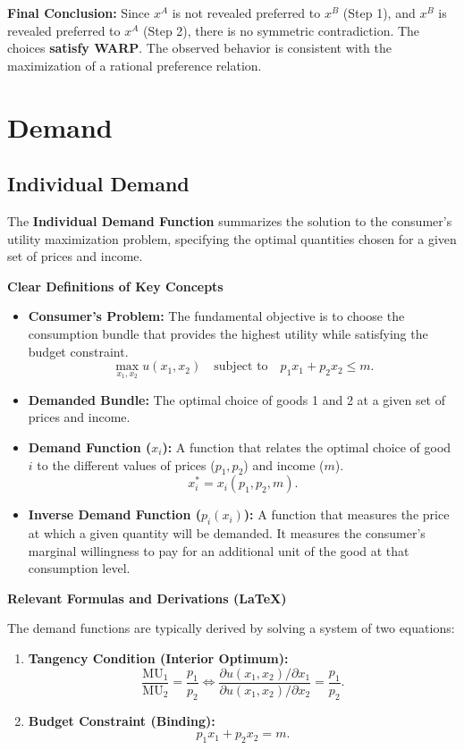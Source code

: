 \documentclass{article}
\begin{document}
\textbf{Final Conclusion:} Since $x^A$ is not revealed preferred to $x^B$ (Step 1), and $x^B$ is revealed preferred to $x^A$ (Step 2), there is no symmetric contradiction. The choices \textbf{satisfy WARP}. The observed behavior is consistent with the maximization of a rational preference relation.

\hrulefill

\section*{Demand}
\subsection*{Individual Demand}

The \textbf{Individual Demand Function} summarizes the solution to the consumer's utility maximization problem, specifying the optimal quantities chosen for a given set of prices and income.

\vspace{1em}
\noindent\textbf{Clear Definitions of Key Concepts}
\begin{itemize}
    \item \textbf{Consumer's Problem:} The fundamental objective is to choose the consumption bundle that provides the highest utility while satisfying the budget constraint. \[\max_{x_1, x_2} u(x_1, x_2) \quad \text{subject to} \quad p_1 x_1 + p_2 x_2 \leq m.\]
    \item \textbf{Demanded Bundle:} The optimal choice of goods 1 and 2 at a given set of prices and income.
    \item \textbf{Demand Function ($x_i$):} A function that relates the optimal choice of good $i$ to the different values of prices ($p_1, p_2$) and income ($m$). \[x_i^* = x_i(p_1, p_2, m).\]
    \item \textbf{Inverse Demand Function ($p_i(x_i)$):} A function that measures the price at which a given quantity will be demanded. It measures the consumer's marginal willingness to pay for an additional unit of the good at that consumption level.
\end{itemize}

\vspace{1em}
\noindent\textbf{Relevant Formulas and Derivations (LaTeX)}
\vspace{0.5em}

\noindent The demand functions are typically derived by solving a system of two equations:
\begin{enumerate}
    \item \textbf{Tangency Condition (Interior Optimum):} \[\frac{\text{MU}_1}{\text{MU}_2} = \frac{p_1}{p_2} \iff \frac{\partial u(x_1, x_2)/\partial x_1}{\partial u(x_1, x_2)/\partial x_2} = \frac{p_1}{p_2}.\]
    \item \textbf{Budget Constraint (Binding):} \[p_1 x_1 + p_2 x_2 = m.\]
\end{enumerate}
\end{document}
